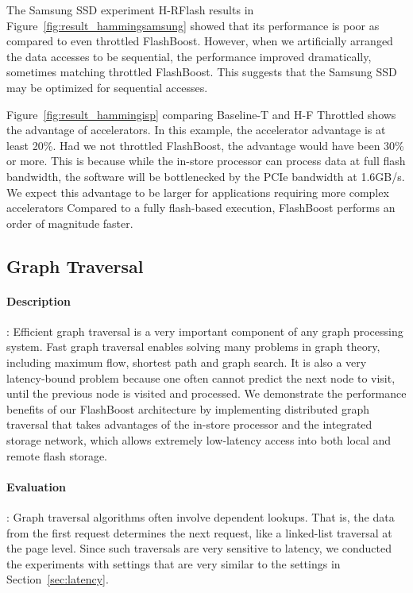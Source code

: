 The Samsung SSD experiment H-RFlash results in
Figure~\ref{fig:result_hammingsamsung} showed that its performance is poor as compared to even throttled FlashBoost. However, when we artificially arranged the data accesses to be sequential, the performance improved dramatically, sometimes matching throttled FlashBoost. This suggests that the Samsung SSD may be optimized for sequential accesses.

Figure~\ref{fig:result_hammingisp} comparing Baseline-T and H-F Throttled shows the advantage of accelerators. In this example, the accelerator advantage is at least 20\%. Had we not throttled FlashBoost, the advantage would have been 30\% or more. This is because while the in-store processor can process data at full flash bandwidth, the software will be bottlenecked by the PCIe bandwidth at 1.6GB/s. We expect this advantage to be larger for applications requiring more complex accelerators
Compared to a fully flash-based execution, FlashBoost performs an order
of magnitude faster.

\subsection{Graph Traversal}

\paragraph{Description} :
Efficient graph traversal is a very important component of any graph processing
system. Fast graph traversal enables solving many problems in graph theory,
including maximum flow, shortest path and graph search. It is also a very
latency-bound problem because one often cannot predict the next node to visit,
until the previous node is visited and processed. We demonstrate the performance
benefits of our FlashBoost architecture by implementing distributed graph
traversal that takes advantages of the in-store processor and the integrated
storage network, which allows extremely low-latency access into both local and
remote flash storage.  

\paragraph{Evaluation} :
Graph traversal algorithms often involve dependent lookups. That is, the data from the first request determines the next request, like a linked-list traversal at the page level. Since such traversals are very sensitive to latency, we conducted the experiments with settings that are very similar to the settings in Section~\ref{sec:latency}.

